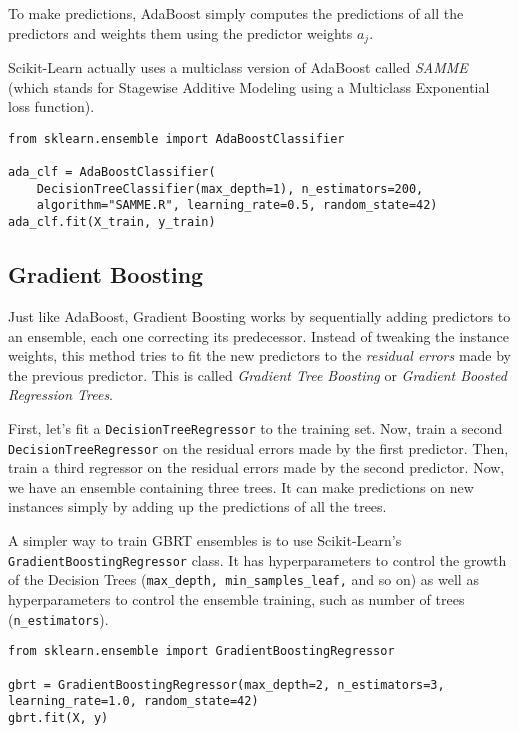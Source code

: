 \documentclass[letterpaper]{article}
\begin{document}
To make predictions, AdaBoost simply computes the predictions of all the predictors and weights them using the predictor weights $a_{j}$. 

Scikit-Learn actually uses a multiclass version of AdaBoost called \textsl{SAMME} (which stands for Stagewise Additive Modeling using a Multiclass Exponential loss function). 

\begin{verbatim}
from sklearn.ensemble import AdaBoostClassifier

ada_clf = AdaBoostClassifier(
    DecisionTreeClassifier(max_depth=1), n_estimators=200,
    algorithm="SAMME.R", learning_rate=0.5, random_state=42)
ada_clf.fit(X_train, y_train)
\end{verbatim}

\subsection{Gradient Boosting}
Just like AdaBoost, Gradient Boosting works by sequentially adding predictors to an ensemble, each one correcting its predecessor. Instead of tweaking the instance weights, this method tries to fit the new predictors to the \textsl{residual errors} made by the previous predictor. This is called \textsl{Gradient Tree Boosting} or \textsl{Gradient Boosted Regression Trees}. 

First, let's fit a \texttt{DecisionTreeRegressor} to the training set. Now, train a second \texttt{DecisionTreeRegressor} on the residual errors made by the first predictor. Then, train a third regressor on the residual errors made by the second predictor. Now, we  have an ensemble containing three trees. It can make predictions on new instances simply by adding up the predictions of all the trees. 

A simpler way to train GBRT ensembles is to use Scikit-Learn's \texttt{GradientBoostingRegressor} class. It has hyperparameters to control the growth of the Decision Trees (\texttt{max\_depth, min\_samples\_leaf,} and so on) as well as hyperparameters to control the ensemble training, such as number of trees (\texttt{n\_estimators}). 

\begin{verbatim}
from sklearn.ensemble import GradientBoostingRegressor

gbrt = GradientBoostingRegressor(max_depth=2, n_estimators=3, learning_rate=1.0, random_state=42)
gbrt.fit(X, y)
\end{verbatim}
\end{document}
